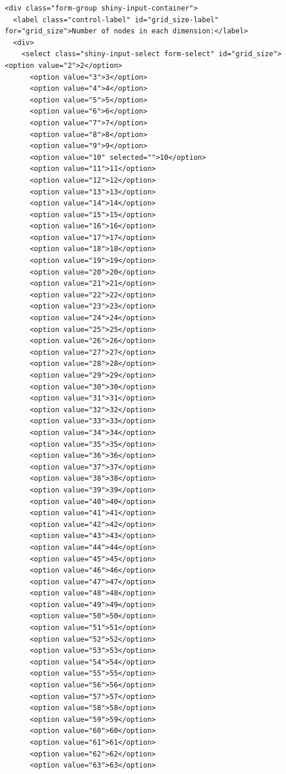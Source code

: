 \documentclass[
  letterpaper,
  DIV=11,
  numbers=noendperiod]{scrartcl}
\begin{document}
\label{input_selects_1-3}
\begin{verbatim}
<div class="form-group shiny-input-container">
  <label class="control-label" id="grid_size-label" for="grid_size">Number of nodes in each dimension:</label>
  <div>
    <select class="shiny-input-select form-select" id="grid_size">      <option value="2">2</option>
      <option value="3">3</option>
      <option value="4">4</option>
      <option value="5">5</option>
      <option value="6">6</option>
      <option value="7">7</option>
      <option value="8">8</option>
      <option value="9">9</option>
      <option value="10" selected="">10</option>
      <option value="11">11</option>
      <option value="12">12</option>
      <option value="13">13</option>
      <option value="14">14</option>
      <option value="15">15</option>
      <option value="16">16</option>
      <option value="17">17</option>
      <option value="18">18</option>
      <option value="19">19</option>
      <option value="20">20</option>
      <option value="21">21</option>
      <option value="22">22</option>
      <option value="23">23</option>
      <option value="24">24</option>
      <option value="25">25</option>
      <option value="26">26</option>
      <option value="27">27</option>
      <option value="28">28</option>
      <option value="29">29</option>
      <option value="30">30</option>
      <option value="31">31</option>
      <option value="32">32</option>
      <option value="33">33</option>
      <option value="34">34</option>
      <option value="35">35</option>
      <option value="36">36</option>
      <option value="37">37</option>
      <option value="38">38</option>
      <option value="39">39</option>
      <option value="40">40</option>
      <option value="41">41</option>
      <option value="42">42</option>
      <option value="43">43</option>
      <option value="44">44</option>
      <option value="45">45</option>
      <option value="46">46</option>
      <option value="47">47</option>
      <option value="48">48</option>
      <option value="49">49</option>
      <option value="50">50</option>
      <option value="51">51</option>
      <option value="52">52</option>
      <option value="53">53</option>
      <option value="54">54</option>
      <option value="55">55</option>
      <option value="56">56</option>
      <option value="57">57</option>
      <option value="58">58</option>
      <option value="59">59</option>
      <option value="60">60</option>
      <option value="61">61</option>
      <option value="62">62</option>
      <option value="63">63</option>

\end{verbatim}
\end{document}

